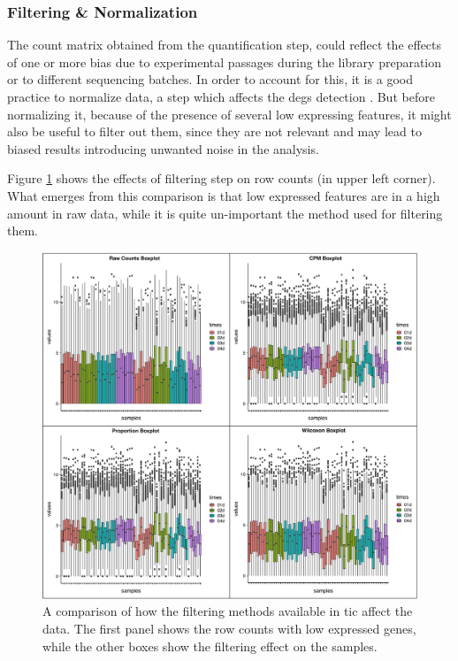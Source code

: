 \subsubsection{Filtering \& Normalization}
The count matrix obtained from the quantification step, could reflect the effects of one or more bias due to experimental passages during the library preparation or to different sequencing batches.
In order to account for this, it is a good practice to normalize data, a step which affects the \glspl{deg} detection \cite{Peixoto2015, Soneson2013d, Bullard2010}.
But before normalizing it, because of the presence of several low expressing features, it might also be useful to filter out them, since they are not relevant and may lead to biased results introducing unwanted noise in the analysis. 

Figure \ref{fig:ticorserfiltering} shows the effects of filtering step on row counts (in upper left corner). 
What emerges from this comparison is that low expressed features are in a high amount in raw data, while it is quite un-important the method used for filtering them.

\begin{figure}[H]
\centering
\includegraphics[width=12cm, keepaspectratio]{img/ticorser/filtering/panel1.pdf}
\caption[ticorser filtering methods]{A comparison of how the filtering methods available in \gls{tic} affect the data.
The first panel shows the row counts with low expressed genes, while the other boxes show the filtering effect on the samples.}
\label{fig:ticorserfiltering}

\end{figure}

